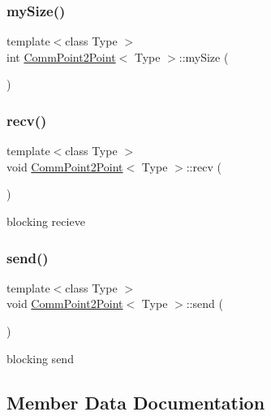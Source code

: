 \subsubsection{\texorpdfstring{my\+Size()}{mySize()}}
{\footnotesize\ttfamily template$<$class Type $>$ \\
int \mbox{\hyperlink{classCommPoint2Point}{Comm\+Point2\+Point}}$<$ Type $>$\+::my\+Size (\begin{DoxyParamCaption}{ }\end{DoxyParamCaption})}

\mbox{\label{classCommPoint2Point_a98dd7b3bbe9cb5b603d9bb29371eb7db}} 
\subsubsection{\texorpdfstring{recv()}{recv()}}
{\footnotesize\ttfamily template$<$class Type $>$ \\
void \mbox{\hyperlink{classCommPoint2Point}{Comm\+Point2\+Point}}$<$ Type $>$\+::recv (\begin{DoxyParamCaption}{ }\end{DoxyParamCaption})}

blocking recieve \mbox{\label{classCommPoint2Point_a974ce073715ec520a0c56f003cb8a1b0}} 
\subsubsection{\texorpdfstring{send()}{send()}}
{\footnotesize\ttfamily template$<$class Type $>$ \\
void \mbox{\hyperlink{classCommPoint2Point}{Comm\+Point2\+Point}}$<$ Type $>$\+::send (\begin{DoxyParamCaption}{ }\end{DoxyParamCaption})}

blocking send 

\subsection{Member Data Documentation}
\mbox{\label{classCommPoint2Point_a992996e177ca0ae1096da26abad93915}} 
